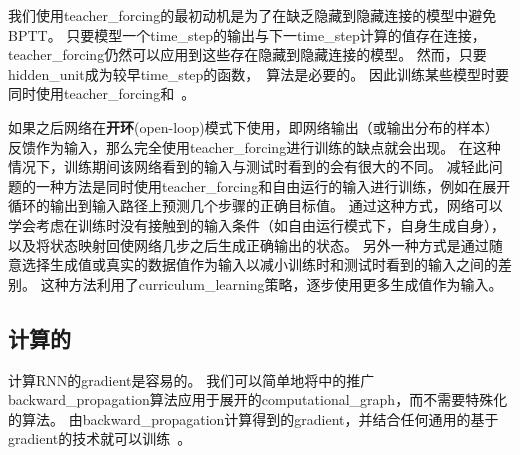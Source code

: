 我们使用\gls{teacher_forcing}的最初动机是为了在缺乏隐藏到隐藏连接的模型中避免\gls{BPTT}。
只要模型一个\gls{time_step}的输出与下一\gls{time_step}计算的值存在连接，\gls{teacher_forcing}仍然可以应用到这些存在隐藏到隐藏连接的模型。
然而，只要\gls{hidden_unit}成为较早\gls{time_step}的函数，~算法是必要的。
因此训练某些模型时要同时使用\gls{teacher_forcing}和~。


如果之后网络在\textbf{开环}(open-loop)模式下使用，即网络输出（或输出分布的样本）反馈作为输入，那么完全使用\gls{teacher_forcing}进行训练的缺点就会出现。
在这种情况下，训练期间该网络看到的输入与测试时看到的会有很大的不同。
减轻此问题的一种方法是同时使用\gls{teacher_forcing}和自由运行的输入进行训练，例如在展开循环的输出到输入路径上预测几个步骤的正确目标值。
通过这种方式，网络可以学会考虑在训练时没有接触到的输入条件（如自由运行模式下，自身生成自身），以及将状态映射回使网络几步之后生成正确输出的状态。
另外一种方式\citep{SamyBengio-et-al-arxiv2015}是通过随意选择生成值或真实的数据值作为输入以减小训练时和测试时看到的输入之间的差别。
这种方法利用了\gls{curriculum_learning}策略，逐步使用更多生成值作为输入。

\subsection{计算的}
\label{sec:computing_the_gradient_in_a_recurrent_neural_network}
计算\gls{RNN}的\gls{gradient}是容易的。
我们可以简单地将中的推广\gls{backward_propagation}算法应用于展开的\gls{computational_graph}，而不需要特殊化的算法。
由\gls{backward_propagation}计算得到的\gls{gradient}，并结合任何通用的基于\gls{gradient}的技术就可以训练~。

